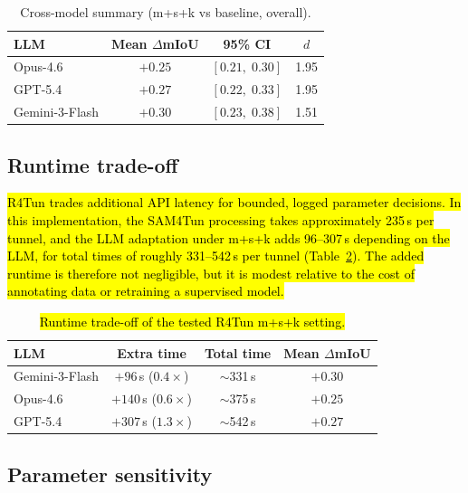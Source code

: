 \documentclass[a4paper,fleqn]{cas-dc}
\begin{document}
{\begin{table}[ht]
\caption{Cross-model summary (m+s+k vs baseline, overall).}\label{tab:cross-model}
\begin{tabular*}{\tblwidth}{@{} l c c c @{}}
\toprule
LLM & Mean $\Delta$mIoU & 95\% CI & \mbox{$d$} \\
\midrule
Opus-4.6 & $+0.25$ & $[0.21,\; 0.30]$ & 1.95 \\
GPT-5.4 & $+0.27$ & $[0.22,\; 0.33]$ & 1.95 \\
Gemini-3-Flash & $+0.30$ & $[0.23,\; 0.38]$ & 1.51 \\
\bottomrule
\end{tabular*}
\end{table}

\subsection{Runtime trade-off}\label{sec:runtime-tradeoff}

\hl{R4Tun trades additional API latency for bounded, logged parameter decisions. In this implementation, the SAM4Tun processing takes approximately 235\,s per tunnel, and the LLM adaptation under m+s+k adds 96--307\,s depending on the LLM, for total times of roughly 331--542\,s per tunnel (Table~\ref{tab:runtime-tradeoff}). The added runtime is therefore not negligible, but it is modest relative to the cost of annotating data or retraining a supervised model.}

\begin{table}[ht]
\caption{\hl{Runtime trade-off of the tested R4Tun m+s+k setting.}}\label{tab:runtime-tradeoff}
\begin{tabular*}{\tblwidth}{@{} l c c c @{}}
\toprule
LLM & Extra time & Total time & Mean $\Delta$mIoU \\
\midrule
Gemini-3-Flash & $+96$\,s ($0.4\times$) & $\sim$331\,s & $+0.30$ \\
Opus-4.6 & $+140$\,s ($0.6\times$) & $\sim$375\,s & $+0.25$ \\
GPT-5.4 & $+307$\,s ($1.3\times$) & $\sim$542\,s & $+0.27$ \\
\bottomrule
\end{tabular*}
\end{table}

\subsection{Parameter sensitivity}\label{sec:sensitivity}

}
\end{document}
